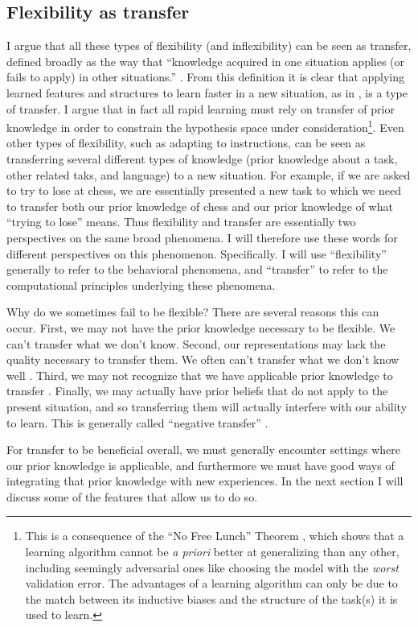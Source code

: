 \subsection{Flexibility as transfer}
I argue that all these types of flexibility (and inflexibility) can be seen as transfer, defined broadly as the way that ``knowledge acquired in one situation applies (or fails to apply) in other situations.'' \citep{Singley1989}. From this definition it is clear that applying learned features and structures to learn faster in a new situation, as in \citet{Bourne1970}, is a type of transfer. I argue that in fact all rapid learning must rely on transfer of prior knowledge in order to constrain the hypothesis space under consideration\footnote{This is a consequence of the ``No Free Lunch'' Theorem \citep{Wolpert1996}, which shows that a learning algorithm cannot be \emph{a priori} better at generalizing than any other, including seemingly adversarial ones like choosing the model with the \emph{worst} validation error. The advantages of a learning algorithm can only be due to the match between its inductive biases and the structure of the task(s) it is used to learn.}. Even other types of flexibility, such as adapting to instructions, can be seen as transferring several different types of knowledge (prior knowledge about a task, other related taks, and language) to a new situation. For example, if we are asked to try to lose at chess, we are essentially presented a new task to which we need to transfer both our prior knowledge of chess and our prior knowledge of what ``trying to lose'' means. Thus flexibility and transfer are essentially two perspectives on the same broad phenomena. I will therefore use these words for different perspectives on this phenomenon. Specifically. I will use ``flexibility'' generally to refer to the behavioral phenomena, and ``transfer'' to refer to the computational principles underlying these phenomena. \par  
Why do we sometimes fail to be flexible? There are several reasons this can occur. First, we may not have the prior knowledge necessary to be flexible. We can't transfer what we don't know. Second, our representations may lack the quality necessary to transfer them. We often can't transfer what we don't know well \citep[c.f.]{Hazzan1999, Weber2001}. Third, we may not recognize that we have applicable prior knowledge to transfer \citep{Detterman1993}. Finally, we may actually have prior beliefs that do not apply to the present situation, and so transferring them will actually interfere with our ability to learn. This is generally called ``negative transfer'' \citep{Singley1989}. \par
For transfer to be beneficial overall, we must generally encounter settings where our prior knowledge is applicable, and furthermore we must have good ways of integrating that prior knowledge with new experiences. In the next section I will discuss some of the features that allow us to do so. \par

